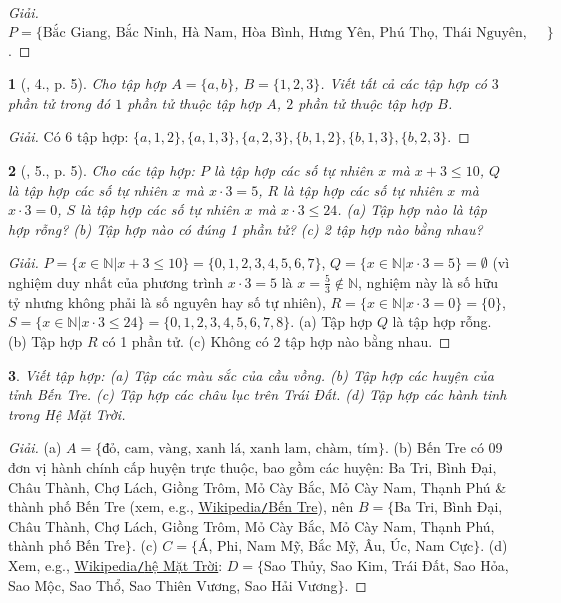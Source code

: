 \documentclass{article}
\newtheorem{baitoan}{}
\begin{document}
\begin{proof}[Giải]
	$P = \{\mbox{Bắc Giang, Bắc Ninh, Hà Nam, Hòa Bình, Hưng Yên, Phú Thọ, Thái Nguyên, Vĩnh Phúc}\}$.
\end{proof}

\begin{baitoan}[\cite{Tuyen_Toan_6}, 4., p. 5]
	Cho tập hợp $A = \{a,b\}$, $B = \{1,2,3\}$. Viết tất cả các tập hợp có $3$ phần tử trong đó $1$ phần tử thuộc tập hợp $A$, $2$ phần tử thuộc tập hợp $B$.
\end{baitoan}

\begin{proof}[Giải]
	Có 6 tập hợp: $\{a,1,2\},\{a,1,3\},\{a,2,3\},\{b,1,2\},\{b,1,3\},\{b,2,3\}$.
\end{proof}

\begin{baitoan}[\cite{Tuyen_Toan_6}, 5., p. 5]
	Cho các tập hợp: $P$ là tập hợp các số tự nhiên $x$ mà $x + 3\le10$, $Q$ là tập hợp các số tự nhiên $x$ mà $x\cdot3 = 5$, $R$ là tập hợp các số tự nhiên $x$ mà $x\cdot3 = 0$, $S$ là tập hợp các số tự nhiên $x$ mà $x\cdot3\le24$. (a) Tập hợp nào là tập hợp rỗng? (b) Tập hợp nào có đúng 1 phần tử? (c) 2 tập hợp nào bằng nhau?
\end{baitoan}

\begin{proof}[Giải]
	$P = \{x\in\mathbb{N}|x + 3\le10\} = \{0,1,2,3,4,5,6,7\}$, $Q = \{x\in\mathbb{N}|x\cdot3 = 5\} = \emptyset$ (vì nghiệm duy nhất của phương trình $x\cdot3 = 5$ là $x = \frac{5}{3}\notin\mathbb{N}$, nghiệm này là số hữu tỷ nhưng không phải là số nguyên hay số tự nhiên), $R = \{x\in\mathbb{N}|x\cdot3 = 0\} = \{0\}$, $S = \{x\in\mathbb{N}|x\cdot3\le24\} = \{0,1,2,3,4,5,6,7,8\}$. (a) Tập hợp $Q$ là tập hợp rỗng. (b) Tập hợp $R$ có 1 phần tử. (c) Không có 2 tập hợp nào bằng nhau.
\end{proof}

\begin{baitoan}
	Viết tập hợp: (a) Tập các màu sắc của cầu vồng. (b) Tập hợp các huyện của tỉnh Bến Tre. (c) Tập hợp các châu lục trên Trái Đất. (d) Tập hợp các hành tinh trong Hệ Mặt Trời.
\end{baitoan}

\begin{proof}[Giải]
	(a) $A = \{\mbox{đỏ, cam, vàng, xanh lá, xanh lam, chàm, tím}\}$. (b) Bến Tre có 09 đơn vị hành chính cấp huyện trực thuộc, bao gồm các huyện: Ba Tri, Bình Đại, Châu Thành, Chợ Lách, Giồng Trôm, Mỏ Cày Bắc, Mỏ Cày Nam, Thạnh Phú \& thành phố Bến Tre (xem, e.g., \href{https://vi.wikipedia.org/wiki/B%E1%BA%BFn_Tre}{Wikipedia{\tt/}Bến Tre}), nên $B = \{$Ba Tri, Bình Đại, Châu Thành, Chợ Lách, Giồng Trôm, Mỏ Cày Bắc, Mỏ Cày Nam, Thạnh Phú, thành phố Bến Tre$\}$. (c) $C = \{$Á, Phi, Nam Mỹ, Bắc Mỹ, Âu, Úc, Nam Cực$\}$. (d) Xem, e.g., \href{https://vi.wikipedia.org/wiki/H%E1%BB%87_M%E1%BA%B7t_Tr%E1%BB%9Di}{Wikipedia{\tt/}hệ Mặt Trời}: $D = \{$Sao Thủy, Sao Kim, Trái Đất, Sao Hỏa, Sao Mộc, Sao Thổ, Sao Thiên Vương, Sao Hải Vương$\}$.
\end{proof}
\end{document}
